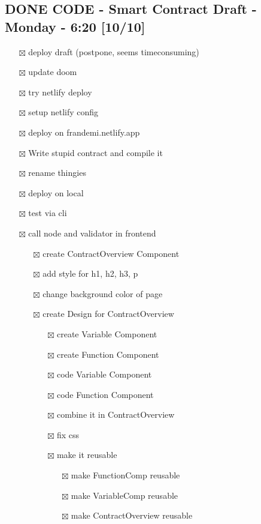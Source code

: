 \documentclass[11pt]{article}
\begin{document}
\subsection{{\bfseries\sffamily DONE} CODE - Smart Contract Draft - Monday - 6:20 [10/10]}
\label{sec:org237fd42}
\begin{itemize}
\item[{$\boxtimes$}] deploy draft (postpone, seems timeconsuming)
\item[{$\boxtimes$}] update doom
\item[{$\boxtimes$}] try netlify deploy
\item[{$\boxtimes$}] setup netlify config
\item[{$\boxtimes$}] deploy on frandemi.netlify.app
\item[{$\boxtimes$}] Write stupid contract and compile it
\item[{$\boxtimes$}] rename thingies
\item[{$\boxtimes$}] deploy on local
\item[{$\boxtimes$}] test via cli
\item[{$\boxtimes$}] call node and validator in frontend
\begin{itemize}
\item[{$\boxtimes$}] create ContractOverview Component
\item[{$\boxtimes$}] add style for h1, h2, h3, p
\item[{$\boxtimes$}] change background color of page
\item[{$\boxtimes$}] create Design for ContractOverview
\begin{itemize}
\item[{$\boxtimes$}] create Variable Component
\item[{$\boxtimes$}] create Function Component
\item[{$\boxtimes$}] code Variable Component
\item[{$\boxtimes$}] code Function Component
\item[{$\boxtimes$}] combine it in ContractOverview
\item[{$\boxtimes$}] fix css
\item[{$\boxtimes$}] make it reusable
\begin{itemize}
\item[{$\boxtimes$}] make FunctionComp reusable
\item[{$\boxtimes$}] make VariableComp reusable
\item[{$\boxtimes$}] make ContractOverview reusable
\end{itemize}

\end{itemize}
\end{itemize}
\end{itemize}
\end{document}
